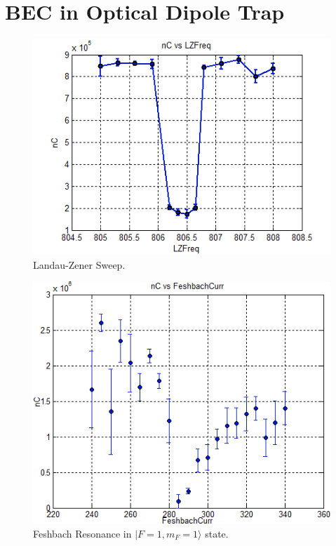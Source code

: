 \section{BEC in Optical Dipole Trap}\label{exp:odt}
\begin{figure}
  \begin{center}
    \includegraphics[width=12cm]{landao-zener.png}
  \end{center}
  \caption{Landau-Zener Sweep.}
  \label{exp:landao-zener}
\end{figure}
\begin{figure}
  \begin{center}
    \includegraphics[width=12cm]{feshbach.png}
  \end{center}
  \caption{Feshbach Resonance in $|F=1, m_F=1\rangle$ state.}
  \label{exp:feshbach}
\end{figure}
